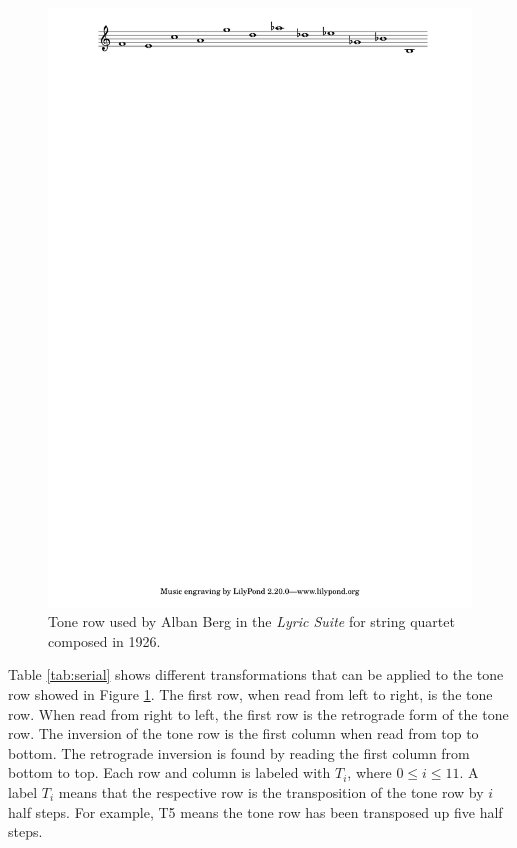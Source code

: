 \begin{figure}[!h]
 \centering
 \includegraphics[width=\columnwidth]{imgs/background/serial.pdf}
 \caption{Tone row used by Alban Berg in the \textit{Lyric Suite} for string quartet composed in 1926.}
 \label{fig:serial}
\end{figure}

Table \ref{tab:serial} shows different transformations that can be applied to the tone
row showed in Figure \ref{fig:serial}. The first row, when read from left to right, is the tone row.
When read from right to left, the first row is the retrograde form of the tone row.
The inversion of the tone row is the first column when read from top to bottom.
The retrograde inversion is found by reading the first column from bottom to top.
Each row and column is labeled with $T_i$, where $0 \leq i \leq 11$. A label
$T_i$ means that the respective row is the transposition of the tone row
by $i$ half steps. For example, T5 means the tone row has been transposed up five half steps.

